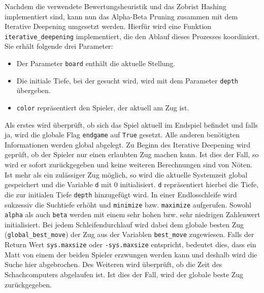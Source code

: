     Nachdem die verwendete Bewertungsheuristik und das Zobrist Hashing
implementiert sind, kann nun das Alpha-Beta Pruning zusammen mit dem
Iterative Deepening umgesetzt werden. Hierfür wird eine Funktion
\texttt{iterative\_deepening} implementiert, die den Ablauf dieses
Prozesses koordiniert. Sie erhält folgende drei Parameter:

\begin{itemize}
\tightlist
\item
  Der Parameter \texttt{board} enthält die aktuelle Stellung.
\item
  Die initiale Tiefe, bei der gesucht wird, wird mit dem Parameter
  \texttt{depth} übergeben.
\item
  \texttt{color} repräsentiert den Spieler, der aktuell am Zug ist.
\end{itemize}

Als erstes wird überprüft, ob sich das Spiel aktuell im Endspiel
befindet und falls ja, wird die globale Flag \texttt{endgame} auf
\texttt{True} gesetzt. Alle anderen benötigten Informationen werden
global abgelegt. Zu Beginn des Iterative Deepening wird geprüft, ob der
Spieler nur einen erlaubten Zug machen kann. Ist dies der Fall, so wird
er sofort zurückgegeben und keine weiteren Berechnungen sind von Nöten.
Ist mehr als ein zulässiger Zug möglich, so wird die aktuelle Systemzeit
global gespeichert und die Variable \texttt{d} mit 0 initialisiert.
\texttt{d} repräsentiert hierbei die Tiefe, die zur initialen Tiefe
\texttt{depth} hinzugefügt wird. In einer Endlosschleife wird sukzessiv
die Suchtiefe erhöht und \texttt{minimize} bzw. \texttt{maximize}
aufgerufen. Sowohl \texttt{alpha} als auch \texttt{beta} werden mit
einem sehr hohen bzw. sehr niedrigen Zahlenwert initialisiert. Bei jedem
Schleifendurchlauf wird dabei dem globale besten Zug
(\texttt{global\_best\_move}) der Zug aus der Variablen
\texttt{best\_move} zugewiesen. Falls der Return Wert
\texttt{sys.maxsize} oder \texttt{-sys.maxsize} entspricht, bedeutet
dies, dass ein Matt von einem der beiden Spieler erzwungen werden kann
und deshalb wird die Suche hier abgebrochen. Des Weiteren wird
überprüft, ob die Zeit des Schachcomputers abgelaufen ist. Ist dies der
Fall, wird der globale beste Zug zurückgegeben.

\bigskip

